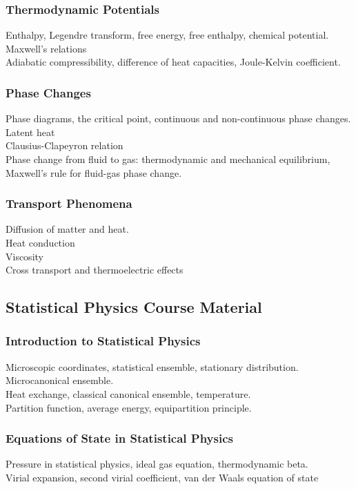 \documentclass[11pt, a4paper]{article}
\begin{document}
\subsubsection{Thermodynamic Potentials}
Enthalpy, Legendre transform, free energy, free enthalpy, chemical potential.\\
Maxwell's relations\\
Adiabatic compressibility, difference of heat capacities, Joule-Kelvin coefficient.

\subsubsection{Phase Changes}
Phase diagrams, the critical point, continuous and non-continuous phase changes.\\
Latent heat\\
Clausius-Clapeyron relation\\
Phase change from fluid to gas: thermodynamic and mechanical equilibrium, Maxwell's rule for fluid-gas phase change.

\subsubsection{Transport Phenomena}
Diffusion of matter and heat.\\
Heat conduction\\
Viscosity\\
Cross transport and thermoelectric effects


\subsection{Statistical Physics Course Material}

\subsubsection{Introduction to Statistical Physics}
Microscopic coordinates, statistical ensemble, stationary distribution.\\
Microcanonical ensemble.\\
Heat exchange, classical canonical ensemble, temperature.\\
Partition function, average energy, equipartition principle.

\subsubsection{Equations of State in Statistical Physics}
Pressure in statistical physics, ideal gas equation, thermodynamic beta.\\
Virial expansion, second virial coefficient, van der Waals equation of state
\end{document}

